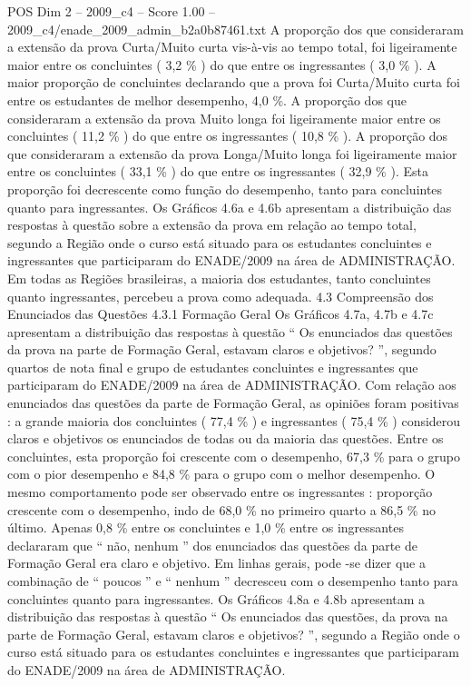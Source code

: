 \begin{textsample}{POS Dim 2 – 2009\_c4 – Score 1.00 – 2009\_c4/enade\_2009\_admin\_b2a0b87461.txt}
A proporção dos que consideraram a extensão da prova Curta/Muito curta vis-à-vis ao tempo total, foi ligeiramente maior entre os concluintes ( 3,2 \% ) do que entre os ingressantes ( 3,0 \% ).
A maior proporção de concluintes declarando que a prova foi Curta/Muito curta foi entre os estudantes de melhor desempenho, 4,0 \%.
A proporção dos que consideraram a extensão da prova Muito longa foi ligeiramente maior entre os concluintes ( 11,2 \% ) do que entre os ingressantes ( 10,8 \% ).
A proporção dos que consideraram a extensão da prova Longa/Muito longa foi ligeiramente maior entre os concluintes ( 33,1 \% ) do que entre os ingressantes ( 32,9 \% ).
Esta proporção foi decrescente como função do desempenho, tanto para concluintes quanto para ingressantes.
Os Gráficos 4.6a e 4.6b apresentam a distribuição das respostas à questão sobre a extensão da prova em relação ao tempo total, segundo a Região onde o curso está situado para os estudantes concluintes e ingressantes que participaram do ENADE/2009 na área de ADMINISTRAÇÃO.
Em todas as Regiões brasileiras, a maioria dos estudantes, tanto concluintes quanto ingressantes, percebeu a prova como adequada. 4.3 Compreensão dos Enunciados das Questões 4.3.1 Formação Geral Os Gráficos 4.7a, 4.7b e 4.7c apresentam a distribuição das respostas à questão “ Os enunciados das questões da prova na parte de Formação Geral, estavam claros e objetivos? ”, segundo quartos de nota final e grupo de estudantes concluintes e ingressantes que participaram do ENADE/2009 na área de ADMINISTRAÇÃO.
Com relação aos enunciados das questões da parte de Formação Geral, as opiniões foram positivas : a grande maioria dos concluintes ( 77,4 \% ) e ingressantes ( 75,4 \% ) considerou claros e objetivos os enunciados de todas ou da maioria das questões.
Entre os concluintes, esta proporção foi crescente com o desempenho, 67,3 \% para o grupo com o pior desempenho e 84,8 \% para o grupo com o melhor desempenho.
O mesmo comportamento pode ser observado entre os ingressantes : proporção crescente com o desempenho, indo de 68,0 \% no primeiro quarto a 86,5 \% no último.
Apenas 0,8 \% entre os concluintes e 1,0 \% entre os ingressantes declararam que “ não, nenhum ” dos enunciados das questões da parte de Formação Geral era claro e objetivo.
Em linhas gerais, pode -se dizer que a combinação de “ poucos ” e “ nenhum ” decresceu com o desempenho tanto para concluintes quanto para ingressantes.
Os Gráficos 4.8a e 4.8b apresentam a distribuição das respostas à questão “ Os enunciados das questões, da prova na parte de Formação Geral, estavam claros e objetivos? ”, segundo a Região onde o curso está situado para os estudantes concluintes e ingressantes que participaram do ENADE/2009 na área de ADMINISTRAÇÃO.

\end{textsample}
